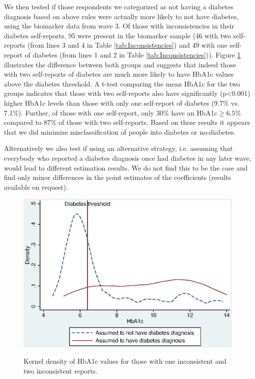 \documentclass[12pt,english]{article}
\begin{document}
\begin{appendix}
We then tested if those respondents we categorized as not having a diabetes diagnosis based on above rules were actually more likely to not have diabetes, using the biomarker data from wave 3. Of those with inconsistencies in their diabetes self-reports, 95 were present in the biomarker sample (46 with two self-reports (from lines 3 and 4 in Table \ref{tab:Inconsistencies}) and 49 with one self-report of diabetes (from lines 1 and 2 in Table \ref{tab:Inconsistencies})). Figure \ref{fig:kdens_inconsistency_hba1c} illustrates the difference between both groups and suggests that indeed those with two self-reports of diabetes are much more likely to have \ac{HbA1c} values above the diabetes threshold. A t-test comparing the mean \ac{HbA1c} for the two groups indicates that those with two self-reports also have significantly (p<0.001) higher \ac{HbA1c} levels than those with only one self-report of diabetes (9.7\% vs. 7.1\%). Further, of those with one self-report,  only 30\% have an \ac{HbA1c}$\geq6.5$\% compared to 87\% of those with two self-reports. Based on these results it appears that we did minimize misclassification of people into diabetes or no-diabetes. 

Alternatively we also test if using an alternative strategy, i.e. assuming that everybody who reported  a diabetes diagnosis once had diabetes in any later wave, would lead to different estimation results. We do not find this to be the case and find only minor differences in the point estimates of the coefficients (results available on request). 

\begin{figure}[h!]
\caption{\label{fig:kdens_inconsistency_hba1c}Kernel density of HbA1c values for those with one inconsistent and two inconsistent reports.}%
\begin{center}
\includegraphics[width=.5\linewidth]{figures/kdensity_hba1c_inconsist.eps}\\
\end{center}
\end{figure}


\end{appendix}
\end{document}
